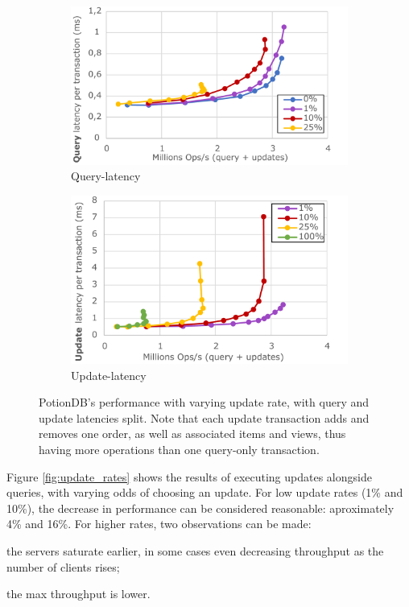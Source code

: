 \documentclass[sigplan,10pt]{acmart}
\begin{document}
\begin{figure}
	\centering
	\begin{subfigure}{.5\linewidth}
		\centering
		\includegraphics[width=.99\linewidth]{updRate_queryLatency_cut}
		\caption{Query-latency}
		\label{fig:update_rates_query}
	\end{subfigure}%
	\begin{subfigure}{.5\linewidth}
		\centering
		\includegraphics[width=.99\linewidth]{updRate_updateLatency_cut}
		\caption{Update-latency}
		\label{fig:update_rates_update}
	\end{subfigure}
	\caption{PotionDB's performance with varying update rate, with query and update latencies split. Note that each update transaction adds and removes one order, as well as associated items and views, thus having more operations than one query-only transaction.}
	\label{fig:update_rates_split}
\end{figure}

Figure \ref{fig:update_rates} shows the results of executing updates alongside queries, with varying odds of choosing an update.
For low update rates (1\% and 10\%), the decrease in performance can be considered reasonable: aproximately 4\% and 16\%.
For higher rates, two observations can be made:
\begin{enumerate*}[label=(\roman*)]
	\item the servers saturate earlier, in some cases even decreasing throughput as the number of clients rises;
	\item the max throughput is lower.
\end{enumerate*}
\end{document}
